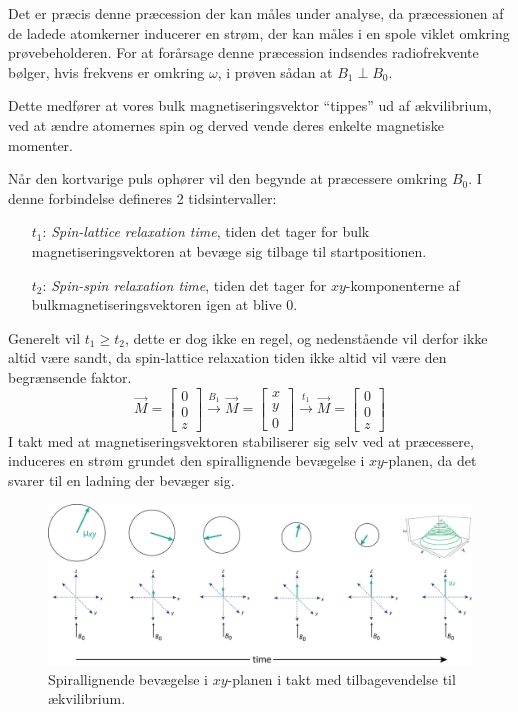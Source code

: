     Det er præcis denne præcession der kan måles under analyse, da præcessionen af de ladede atomkerner inducerer en strøm, der kan måles i en spole viklet omkring prøvebeholderen. For at forårsage denne præcession indsendes radiofrekvente bølger, hvis frekvens er omkring $\omega$, i prøven sådan at $B_1 \perp B_0$. 

    Dette medfører at vores bulk magnetiseringsvektor ``tippes'' ud af ækvilibrium, ved at ændre atomernes spin og derved vende deres enkelte magnetiske momenter. 

    Når den kortvarige puls ophører vil den begynde at præcessere omkring $B_0$. I denne forbindelse defineres 2 tidsintervaller:
    \begin{itemize}
        \item[$t_1$:] \textit{Spin-lattice relaxation time}, tiden det tager for bulk magnetiseringsvektoren at bevæge sig tilbage til startpositionen.
        \item[$t_2$:] \textit{Spin-spin relaxation time}, tiden det tager for $xy$-komponenterne af bulkmagnetiseringsvektoren igen at blive 0. 
    \end{itemize}
    Generelt vil $t_1 \geq t_2$, dette er dog ikke en regel, og nedenstående vil derfor ikke altid være sandt, da spin-lattice relaxation tiden ikke altid vil være den begrænsende faktor.
    \[
        \vec{M}=
        \begin{bmatrix}
            0 \\
            0 \\
            z
        \end{bmatrix}
        \stackrel{B_1}{\longrightarrow}
        \vec{M}=
        \begin{bmatrix}
            x \\
            y \\
            0
        \end{bmatrix}
        \stackrel{t_1}{\longrightarrow}
        \vec{M}=
        \begin{bmatrix}
            0 \\
            0 \\
            z
        \end{bmatrix}
    \]
    I takt med at magnetiseringsvektoren stabiliserer sig selv ved at præcessere, induceres en strøm grundet den spirallignende bevægelse i $xy$-planen, da det svarer til en ladning der bevæger sig. 
    \begin{figure}[H]\centering
        \includegraphics[width=\textwidth]{billeder/spiral}
        \caption{Spirallignende bevægelse i $xy$-planen i takt med tilbagevendelse til ækvilibrium.}
    \end{figure}
